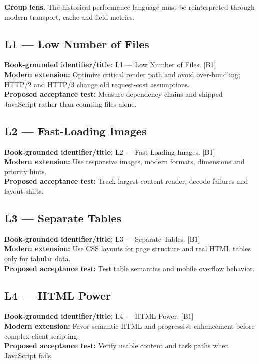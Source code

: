 \documentclass[11pt]{article}
\begin{document}
\begin{notebox}\textbf{Group lens.} The historical performance language must be reinterpreted through modern transport, cache and field metrics.\end{notebox}
\subsection{L1 — Low Number of Files}
\noindent\textcolor{Ocean}{\textbf{Book-grounded identifier/title:}} L1 — Low Number of Files. [B1]\\
\textcolor{Mint}{\textbf{Modern extension:}} Optimize critical render path and avoid over-bundling; HTTP/2 and HTTP/3 change old request-cost assumptions.\\
\textcolor{Amber}{\textbf{Proposed acceptance test:}} Measure dependency chains and shipped JavaScript rather than counting files alone.\medskip
\subsection{L2 — Fast-Loading Images}
\noindent\textcolor{Ocean}{\textbf{Book-grounded identifier/title:}} L2 — Fast-Loading Images. [B1]\\
\textcolor{Mint}{\textbf{Modern extension:}} Use responsive images, modern formats, dimensions and priority hints.\\
\textcolor{Amber}{\textbf{Proposed acceptance test:}} Track largest-content render, decode failures and layout shifts.\medskip
\subsection{L3 — Separate Tables}
\noindent\textcolor{Ocean}{\textbf{Book-grounded identifier/title:}} L3 — Separate Tables. [B1]\\
\textcolor{Mint}{\textbf{Modern extension:}} Use CSS layouts for page structure and real HTML tables only for tabular data.\\
\textcolor{Amber}{\textbf{Proposed acceptance test:}} Test table semantics and mobile overflow behavior.\medskip
\subsection{L4 — HTML Power}
\noindent\textcolor{Ocean}{\textbf{Book-grounded identifier/title:}} L4 — HTML Power. [B1]\\
\textcolor{Mint}{\textbf{Modern extension:}} Favor semantic HTML and progressive enhancement before complex client scripting.\\
\textcolor{Amber}{\textbf{Proposed acceptance test:}} Verify usable content and task paths when JavaScript fails.\medskip
\end{document}
